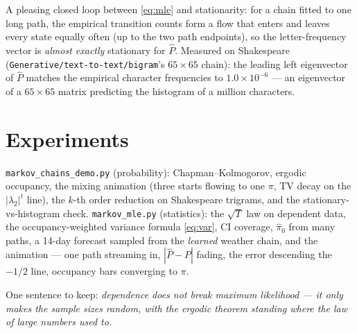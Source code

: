 \documentclass[11pt]{article}
\begin{document}
A pleasing closed loop between \eqref{eq:mle} and stationarity: for a
chain fitted to one long path, the empirical transition counts form a
flow that enters and leaves every state equally often (up to the two
path endpoints), so the letter-frequency vector is \emph{almost
exactly} stationary for $\hat P$. Measured on Shakespeare
(\texttt{Generative/text-to-text/bigram}'s $65 \times 65$ chain): the leading left
eigenvector of $\hat P$ matches the empirical character frequencies to
$1.0\times10^{-6}$ --- an eigenvector of a $65\times65$ matrix
predicting the histogram of a million characters.

\section{Experiments}

\texttt{markov\_chains\_demo.py} (probability): Chapman--Kolmogorov,
ergodic occupancy, the mixing animation (three starts flowing to one
$\pi$, TV decay on the $|\lambda_2|^t$ line), the $k$-th order
reduction on Shakespeare trigrams, and the stationary-vs-histogram
check. \texttt{markov\_mle.py} (statistics): the $\sqrt{T}$ law on
dependent data, the occupancy-weighted variance formula
\eqref{eq:var}, CI coverage, $\hat\pi_0$ from many paths, a 14-day
forecast sampled from the \emph{learned} weather chain, and the
animation --- one path streaming in, $|\hat P - P|$ fading, the error
descending the $-1/2$ line, occupancy bars converging to $\pi$.

One sentence to keep: \emph{dependence does not break maximum
likelihood --- it only makes the sample sizes random, with the ergodic
theorem standing where the law of large numbers used to.}
\end{document}
